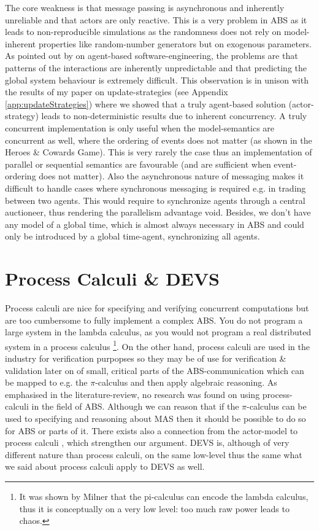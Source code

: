 The core weakness is that message passing is asynchronous and inherently unreliable and that actors are only reactive. This is a very problem in ABS as it leads to non-reproducible simulations as the randomness does not rely on model-inherent properties like random-number generators but on exogenous parameters. As pointed out by \cite{jennings_agent-based_2000} on agent-based software-engineering, the problems are that patterns of the interactions are inherently unpredictable and that predicting the global system behaviour is extremely difficult. This observation is in unison with the results of my paper on update-strategies (see Appendix \ref{app:updateStrategies}) where we showed that a truly agent-based solution (actor-strategy) leads to non-deterministic results due to inherent concurrency. A truly concurrent implementation is only useful when the model-semantics are concurrent as well, where the ordering of events does not matter (as shown in the Heroes \& Cowards Game). This is very rarely the case thus an implementation of parallel or sequential semantics are favourable (and are sufficient when event-ordering does not matter).
Also the asynchronous nature of messaging makes it difficult to handle cases where synchronous messaging is required e.g. in trading between two agents. This would require to synchronize agents through a central auctioneer, thus rendering the parallelism advantage void. Besides, we don't have any model of a global time, which is almost always necessary in ABS and could only be introduced by a global time-agent, synchronizing all agents.

\section{Process Calculi \& DEVS}
Process calculi are nice for specifying and verifying concurrent computations but are too cumbersome to fully implement a complex ABS. You do not program a large system in the lambda calculus, as you would not program a real distributed system in a process calculus \footnote{It was shown by Milner \cite{milner_functions_1992} that the pi-calculus can encode the lambda calculus, thus it is conceptually on a very low level: too much raw power leads to chaos.}. On the other hand, process calculi are used in the industry for verification purpopses so they may be of use for verification \& validation later on of small, critical parts of the ABS-communication which can be mapped to e.g. the $\pi$-calculus and then apply algebraic reasoning. As emphasised in the literature-review, no research was found on using process-calculi in the field of ABS. Although we can reason that if the $\pi$-calculus can be used to specifying and reasoning about MAS then it should be possible to do so for ABS or parts of it. There exists also a connection from the actor-model to process calculi \cite{agha_foundation_1997}, which strengthen our argument. 
DEVS is, although of very different nature than process calculi, on the same low-level thus the same what we said about process calculi apply to DEVS as well.

